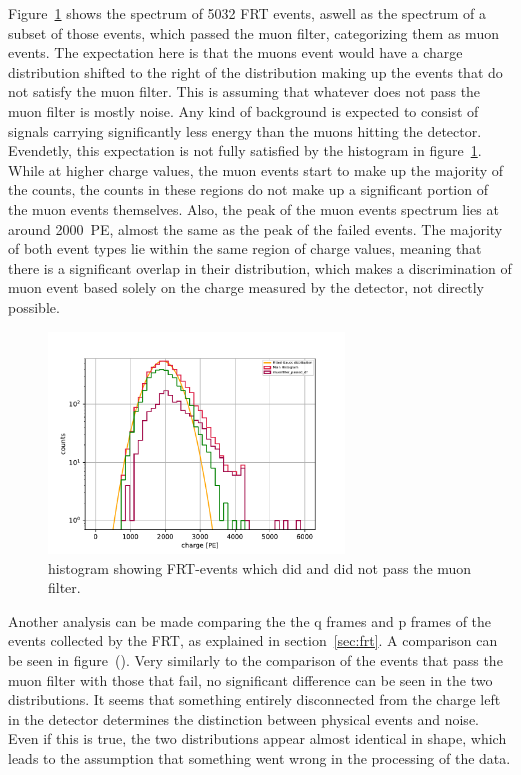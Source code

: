 Figure~\ref{fig:frt_mu_2} shows the spectrum of \num{5032} FRT events, aswell as the spectrum of a subset of those events, which passed the muon filter, categorizing 
them as muon events. The expectation here is that the muons event would have a charge distribution shifted to the right of the distribution making up the events 
that do not satisfy the muon filter. This is assuming that whatever does not pass the muon filter is mostly noise. Any kind of background is expected to consist
of signals carrying significantly less energy than the muons hitting the detector. Evendetly, this expectation is not fully satisfied by the histogram in 
figure~\ref{fig:frt_mu_2}. While at higher charge values, the muon events start to make up the majority of the counts, the counts in these regions do not make up 
a significant portion of the muon events themselves. Also, the peak of the muon events spectrum lies at around \num{2000}~PE, almost the same as the peak of the 
failed events. The majority of both event types lie within the same region of charge values, meaning that there is a significant overlap in their distribution, 
which makes a discrimination of muon event based solely on the charge measured by the detector, not directly possible. 
\begin{figure}
    \centering
    \includegraphics[width=0.7\textwidth]{Plots/frt_muon_filter.pdf}
    \caption{histogram showing FRT-events which did and did not pass the muon filter.}
    \label{fig:frt_mu_2}
\end{figure}

Another analysis can be made comparing the the q frames and p frames of the events collected by the FRT, as explained in section~\ref{sec:frt}. A comparison can be seen in 
figure~(). Very similarly to the comparison of the events that pass the muon filter with those that fail, no significant difference can be seen in the two distributions. 
It seems that something entirely disconnected from the charge left in the detector determines the distinction between physical events and noise. Even if this is true, 
the two distributions appear almost identical in shape, which leads to the assumption that something went wrong in the processing of the data. 

